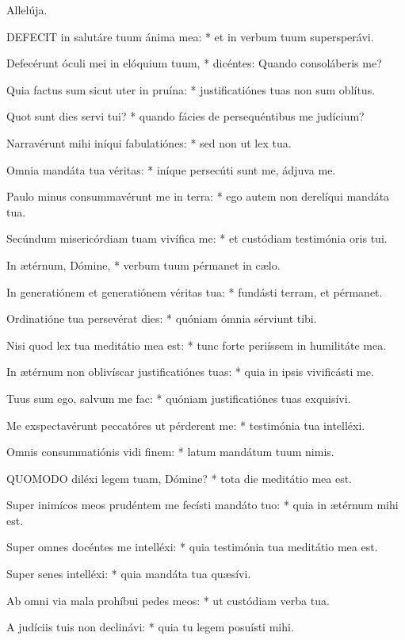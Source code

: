  Allelúja.


\lettrine[lines=2]{D}{EFECIT} in salutáre tuum ánima mea: * et in verbum tuum supersperávi.

Defecérunt óculi mei in elóquium tuum, * dicéntes: Quando consoláberis me?

Quia factus sum sicut uter in pruína: * justificatiónes tuas non sum oblítus.

Quot sunt dies servi tui? * quando fácies de persequéntibus me judícium?

Narravérunt mihi iníqui fabulatiónes: * sed non ut lex tua.

Omnia mandáta tua véritas: * iníque persecúti sunt me, ádjuva me.

Paulo minus consummavérunt me in terra: * ego autem non derelíqui mandáta tua.

Secúndum misericórdiam tuam vivífica me: * et custódiam testimónia oris tui.

In ætérnum, Dómine, * verbum tuum pérmanet in cælo.

In generatiónem et generatiónem véritas tua: * fundásti terram, et pérmanet.

Ordinatióne tua persevérat dies: * quóniam ómnia sérviunt tibi.

Nisi quod lex tua meditátio mea est: * tunc forte periíssem in humilitáte mea.

In ætérnum non oblivíscar justificatiónes tuas: * quia in ipsis vivificásti me.

Tuus sum ego, salvum me fac: * quóniam justificatiónes tuas exquisívi.

Me exspectavérunt peccatóres ut pérderent me: * testimónia tua intelléxi.

Omnis consummatiónis vidi finem: * latum mandátum tuum nimis.


\lettrine[lines=2]{Q}{UOMODO} diléxi legem tuam, Dómine? * tota die meditátio mea est.

Super inimícos meos prudéntem me fecísti mandáto tuo: * quia in ætérnum mihi est.

Super omnes docéntes me intelléxi: * quia testimónia tua meditátio mea est.

Super senes intelléxi: * quia mandáta tua quæsívi.

Ab omni via mala prohíbui pedes meos: * ut custódiam verba tua.

A judíciis tuis non declinávi: * quia tu legem posuísti mihi.

